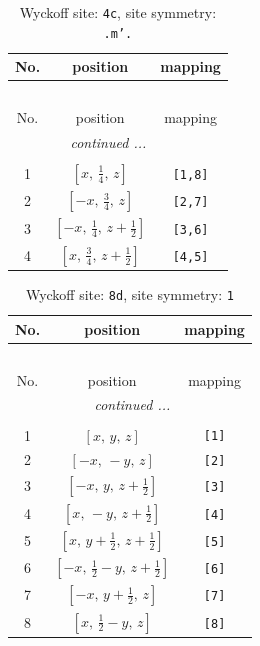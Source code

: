 \documentclass[fleqn,8pt]{jsarticle}
\begin{document}
\renewcommand{\arraystretch}{1.2}
\begin{longtable}{ccc}
\caption{Wyckoff site: {\tt 4c}, site symmetry: {\tt .m'.}}
 \\
 \hline \hline
No. & position & mapping \\ \hline \endfirsthead

\multicolumn{2}{l}{\tablename\ \thetable{}} \\
 \hline \hline
No. & position & mapping \\ \hline \endhead

 \hline \hline
\multicolumn{2}{r}{\footnotesize\it continued ...} \\ \endfoot

 \hline \hline
\multicolumn{2}{r}{} \\ \endlastfoot

1 & $\left[ x,\, \frac{1}{4},\, z \right]$ & {\tt [1,8]} \\ \hline
2 & $\left[ - x,\, \frac{3}{4},\, z \right]$ & {\tt [2,7]} \\ \hline
3 & $\left[ - x,\, \frac{1}{4},\, z + \frac{1}{2} \right]$ & {\tt [3,6]} \\ \hline
4 & $\left[ x,\, \frac{3}{4},\, z + \frac{1}{2} \right]$ & {\tt [4,5]} \\
\end{longtable}
\renewcommand{\arraystretch}{1.2}
\begin{longtable}{ccc}
\caption{Wyckoff site: {\tt 8d}, site symmetry: {\tt 1}}
 \\
 \hline \hline
No. & position & mapping \\ \hline \endfirsthead

\multicolumn{2}{l}{\tablename\ \thetable{}} \\
 \hline \hline
No. & position & mapping \\ \hline \endhead

 \hline \hline
\multicolumn{2}{r}{\footnotesize\it continued ...} \\ \endfoot

 \hline \hline
\multicolumn{2}{r}{} \\ \endlastfoot

1 & $\left[ x,\, y,\, z \right]$ & {\tt [1]} \\ \hline
2 & $\left[ - x,\, - y,\, z \right]$ & {\tt [2]} \\ \hline
3 & $\left[ - x,\, y,\, z + \frac{1}{2} \right]$ & {\tt [3]} \\ \hline
4 & $\left[ x,\, - y,\, z + \frac{1}{2} \right]$ & {\tt [4]} \\ \hline
5 & $\left[ x,\, y + \frac{1}{2},\, z + \frac{1}{2} \right]$ & {\tt [5]} \\ \hline
6 & $\left[ - x,\, \frac{1}{2} - y,\, z + \frac{1}{2} \right]$ & {\tt [6]} \\ \hline
7 & $\left[ - x,\, y + \frac{1}{2},\, z \right]$ & {\tt [7]} \\ \hline
8 & $\left[ x,\, \frac{1}{2} - y,\, z \right]$ & {\tt [8]} \\
\end{longtable}
\end{document}
